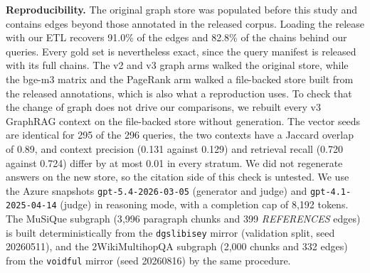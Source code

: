 \noindent\textbf{Reproducibility.} The original graph store was populated
before this study and contains edges beyond those annotated in the
released corpus. Loading the release with our ETL recovers 91.0\% of
the edges and 82.8\% of the chains behind our queries. Every gold set is
nevertheless exact, since the query manifest is released with its full
chains. The v2 and v3 graph arms walked the original store, while
the bge-m3 matrix and the PageRank arm walked a file-backed store built
from the released annotations, which is also what a reproduction uses.
To check that the change of graph does not drive our comparisons, we
rebuilt every v3 GraphRAG context on the file-backed store without
generation. The vector seeds are identical for 295 of the 296 queries,
the two contexts have a Jaccard overlap of 0.89, and context precision
(0.131 against 0.129) and retrieval recall (0.720 against 0.724) differ
by at most 0.01 in every stratum. We did not regenerate answers on the
new store, so the citation side of this check is untested.
We use the Azure snapshots \texttt{gpt-5.4-}\allowbreak\texttt{2026-03-05}
(generator and judge) and \texttt{gpt-4.1-2025-04-14} (judge) in
reasoning mode, with a completion cap of 8{,}192 tokens. The MuSiQue
subgraph (3{,}996 paragraph chunks and 399 \textit{REFERENCES} edges) is
built deterministically from the \texttt{dgslibisey} mirror (validation
split, seed 20260511), and the 2WikiMultihopQA subgraph (2{,}000 chunks
and 332 edges) from the \texttt{voidful} mirror (seed 20260816) by the
same procedure.
